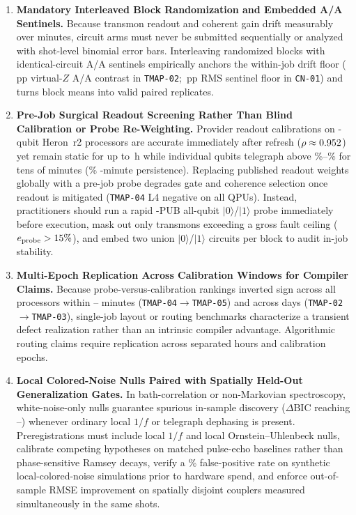 \documentclass[twocolumn,aps,prapplied,superscriptaddress,floatfix]{revtex4-2}
\begin{document}
\begin{enumerate}
\item \textbf{Mandatory Interleaved Block Randomization and Embedded A/A Sentinels.} Because transmon readout and coherent gain drift measurably over minutes, circuit arms must never be submitted sequentially or analyzed with shot-level binomial error bars. Interleaving randomized blocks with identical-circuit A/A sentinels empirically anchors the within-job drift floor (\TmapTwoAaVirtualZPp\,pp virtual-$Z$ A/A contrast in \texttt{TMAP-02}; \CnAaRmsRawPp\,pp RMS sentinel floor in \texttt{CN-01}) and turns block means into valid paired replicates.
\item \textbf{Pre-Job Surgical Readout Screening Rather Than Blind Calibration or Probe Re-Weighting.} Provider readout calibrations on \ChipQubits{}-qubit Heron~r2 processors are accurate immediately after refresh ($\rho \approx 0.952$) yet remain static for up to \RoKingstonUnchangedHours{}\,h while individual qubits telegraph above \RoFaultThreshPct\%--\TmapThreeQFortySixZeroToOnePct\% for tens of minutes (\RoPersistFaultPct\% \RoSixIntervalMin{}-minute persistence). Replacing published readout weights globally with a pre-job probe degrades gate and coherence selection once readout is mitigated (\texttt{TMAP-04} L4 negative on all \NumBackends{} QPUs). Instead, practitioners should run a rapid \TmapProbePubs{}-PUB all-qubit $|0\rangle$/$|1\rangle$ probe immediately before execution, mask out only transmons exceeding a gross fault ceiling ($e_{\mathrm{probe}} > 15\%$), and embed two union $|0\rangle$/$|1\rangle$ circuits per block to audit in-job stability.
\item \textbf{Multi-Epoch Replication Across Calibration Windows for Compiler Claims.} Because probe-versus-calibration rankings inverted sign across all \NumBackends{} processors within \TmapDtMinLow{}--\TmapDtMinHigh{} minutes (\texttt{TMAP-04}$\to$\texttt{TMAP-05}) and across \TmapThreeDaysLater{} days (\texttt{TMAP-02}$\to$\texttt{TMAP-03}), single-job layout or routing benchmarks characterize a transient defect realization rather than an intrinsic compiler advantage. Algorithmic routing claims require replication across separated hours and calibration epochs.
\item \textbf{Local Colored-Noise Nulls Paired with Spatially Held-Out Generalization Gates.} In bath-correlation or non-Markovian spectroscopy, white-noise-only nulls guarantee spurious in-sample discovery ($\Delta\mathrm{BIC}$ reaching \CnValOuMedDbic{}--\CnValDetunedMedDbic) whenever ordinary local $1/f$ or telegraph dephasing is present. Preregistrations must include local $1/f$ and local Ornstein--Uhlenbeck nulls, calibrate competing hypotheses on matched pulse-echo baselines rather than phase-sensitive Ramsey decays, verify a \CnValAThreeLocalFpPct\% false-positive rate on synthetic local-colored-noise simulations prior to hardware spend, and enforce out-of-sample RMSE improvement on spatially disjoint couplers measured simultaneously in the same shots.
\end{enumerate}
\end{document}

